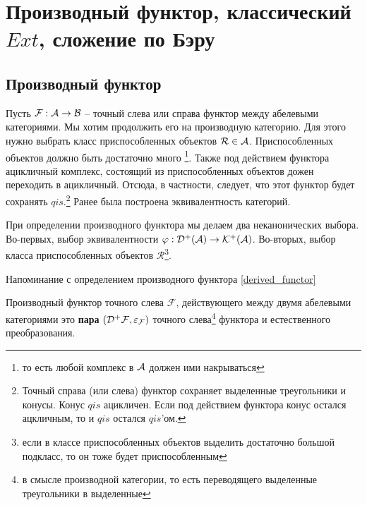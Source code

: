\documentclass[../hw_main.tex]{subfiles}
\begin{document}
\section{Производный функтор, классический $Ext$, сложение по Бэру}
\subsection{Производный функтор}
Пусть $\mathcal{F}: \mathcal{A} \rightarrow \mathcal{B}$ -- точный слева или справа функтор между абелевыми категориями. Мы хотим продолжить его на производную категорию. Для этого нужно выбрать класс приспособленных объектов $\mathcal{R} \in \mathcal{A}$. Приспособленных объектов должно быть достаточно много \footnote{то есть любой комплекс в $\mathcal{A}$ должен ими накрываться}. Также под действием функтора ацикличный комплекс, состоящий из приспособленных объектов дожен переходить в ацикличный. Отсюда, в частности, следует, что этот функтор будет сохранять $qis$.\footnote{Точный справа (или слева) функтор сохраняет выделенные треугольники и конусы. Конус $qis$ ацикличен. Если под действием функтора конус остался ацкличным, то и $qis$ остался $qis$'ом.}
Ранее была построена эквивалентность категорий.
\bee
{}
\eee
\bee
{}
\eee
\begin{to_com}
При определении производного функтора мы делаем два неканонических  выбора. Во-первых, выбор эквивалентности $\varphi: \mathcal{D^+(A)} \rightarrow \mathcal{K^+(A)}$. Во-вторых, выбор класса приспособленных объектов $\mathcal{R}$\footnote{если в классе приспособленных объектов выделить достаточно большой подкласс, то он тоже будет приспособленным}.
\end{to_com}
Напоминание с определением производного функтора \ref{derived_functor}
\begin{to_def}
Производный функтор точного слева $\mathcal{F}$, действующего между двумя абелевыми категориями это \textbf{пара} $(\mathcal{D^+ F}, \varepsilon_{\mathcal{F}})$ точного слева\footnote{в смысле производной категории, то есть переводящего выделенные треугольники в выделенные} функтора и естественного преобразования.\\
\bee
{}
\eee
\bee
{}
\eee
\end{to_def}
\end{document}
